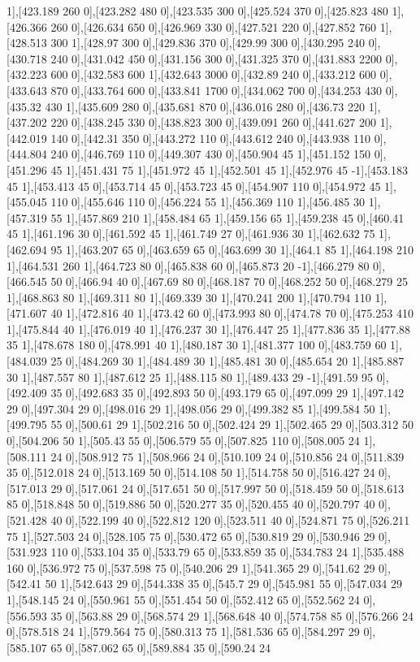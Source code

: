 {1],[423.189 260 0],[423.282 480 0],[423.535 300 0],[425.524 370 0],[425.823 480 1],[426.366 260 0],[426.634 650 0],[426.969 330 0],[427.521 220 0],[427.852 760 1],[428.513 300 1],[428.97 300 0],[429.836 370 0],[429.99 300 0],[430.295 240 0],[430.718 240 0],[431.042 450 0],[431.156 300 0],[431.325 370 0],[431.883 2200 0],[432.223 600 0],[432.583 600 1],[432.643 3000 0],[432.89 240 0],[433.212 600 0],[433.643 870 0],[433.764 600 0],[433.841 1700 0],[434.062 700 0],[434.253 430 0],[435.32 430 1],[435.609 280 0],[435.681 870 0],[436.016 280 0],[436.73 220 1],[437.202 220 0],[438.245 330 0],[438.823 300 0],[439.091 260 0],[441.627 200 1],[442.019 140 0],[442.31 350 0],[443.272 110 0],[443.612 240 0],[443.938 110 0],[444.804 240 0],[446.769 110 0],[449.307 430 0],[450.904 45 1],[451.152 150 0],[451.296 45 1],[451.431 75 1],[451.972 45 1],[452.501 45 1],[452.976 45 -1],[453.183 45 1],[453.413 45 0],[453.714 45 0],[453.723 45 0],[454.907 110 0],[454.972 45 1],[455.045 110 0],[455.646 110 0],[456.224 55 1],[456.369 110 1],[456.485 30 1],[457.319 55 1],[457.869 210 1],[458.484 65 1],[459.156 65 1],[459.238 45 0],[460.41 45 1],[461.196 30 0],[461.592 45 1],[461.749 27 0],[461.936 30 1],[462.632 75 1],[462.694 95 1],[463.207 65 0],[463.659 65 0],[463.699 30 1],[464.1 85 1],[464.198 210 1],[464.531 260 1],[464.723 80 0],[465.838 60 0],[465.873 20 -1],[466.279 80 0],[466.545 50 0],[466.94 40 0],[467.69 80 0],[468.187 70 0],[468.252 50 0],[468.279 25 1],[468.863 80 1],[469.311 80 1],[469.339 30 1],[470.241 200 1],[470.794 110 1],[471.607 40 1],[472.816 40 1],[473.42 60 0],[473.993 80 0],[474.78 70 0],[475.253 410 1],[475.844 40 1],[476.019 40 1],[476.237 30 1],[476.447 25 1],[477.836 35 1],[477.88 35 1],[478.678 180 0],[478.991 40 1],[480.187 30 1],[481.377 100 0],[483.759 60 1],[484.039 25 0],[484.269 30 1],[484.489 30 1],[485.481 30 0],[485.654 20 1],[485.887 30 1],[487.557 80 1],[487.612 25 1],[488.115 80 1],[489.433 29 -1],[491.59 95 0],[492.409 35 0],[492.683 35 0],[492.893 50 0],[493.179 65 0],[497.099 29 1],[497.142 29 0],[497.304 29 0],[498.016 29 1],[498.056 29 0],[499.382 85 1],[499.584 50 1],[499.795 55 0],[500.61 29 1],[502.216 50 0],[502.424 29 1],[502.465 29 0],[503.312 50 0],[504.206 50 1],[505.43 55 0],[506.579 55 0],[507.825 110 0],[508.005 24 1],[508.111 24 0],[508.912 75 1],[508.966 24 0],[510.109 24 0],[510.856 24 0],[511.839 35 0],[512.018 24 0],[513.169 50 0],[514.108 50 1],[514.758 50 0],[516.427 24 0],[517.013 29 0],[517.061 24 0],[517.651 50 0],[517.997 50 0],[518.459 50 0],[518.613 85 0],[518.848 50 0],[519.886 50 0],[520.277 35 0],[520.455 40 0],[520.797 40 0],[521.428 40 0],[522.199 40 0],[522.812 120 0],[523.511 40 0],[524.871 75 0],[526.211 75 1],[527.503 24 0],[528.105 75 0],[530.472 65 0],[530.819 29 0],[530.946 29 0],[531.923 110 0],[533.104 35 0],[533.79 65 0],[533.859 35 0],[534.783 24 1],[535.488 160 0],[536.972 75 0],[537.598 75 0],[540.206 29 1],[541.365 29 0],[541.62 29 0],[542.41 50 1],[542.643 29 0],[544.338 35 0],[545.7 29 0],[545.981 55 0],[547.034 29 1],[548.145 24 0],[550.961 55 0],[551.454 50 0],[552.412 65 0],[552.562 24 0],[556.593 35 0],[563.88 29 0],[568.574 29 1],[568.648 40 0],[574.758 85 0],[576.266 24 0],[578.518 24 1],[579.564 75 0],[580.313 75 1],[581.536 65 0],[584.297 29 0],[585.107 65 0],[587.062 65 0],[589.884 35 0],[590.24 24 }
